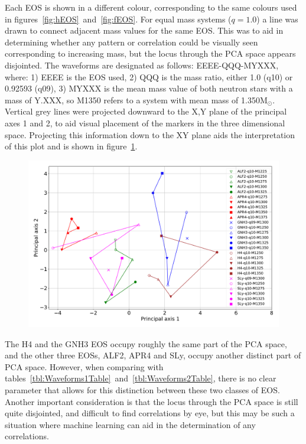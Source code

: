 Each EOS is shown in a different colour, corresponding to the same colours used in figures~\ref{fig:hEOS}~and~\ref{fig:fEOS}. For equal mass systems ($q=1.0$) a line was drawn to connect adjacent mass values for the same EOS. This was to aid in determining whether any pattern or correlation could be visually seen corresponding to increasing mass, but the locus through the PCA space appears disjointed. The waveforms are designated as follows: EEEE-QQQ-MYXXX, where: 1) EEEE is the EOS used, 2) QQQ is the mass ratio, either 1.0 (q10) or 0.92593 (q09), 3) MYXXX is the mean mass value of both neutron stars with a mass of Y.XXX, so M1350 refers to a system with mean mass of 1.350M$_\odot$. Vertical grey lines were projected downward to the X,Y plane of the principal axes 1 and 2, to aid visual placement of the markers in the three dimensional space. Projecting this information down to the XY plane aids the interpretation of this plot  and is shown in figure~\ref{fig:PCAScaled2Damp}.
\begin{figure}[H]
	\centering
	\includegraphics[width=15cm]{./img/PCAScaled2Damp.pdf} 
	\caption[\protect]{\protect}
	\label{fig:PCAScaled2Damp}
\end{figure}
The H4 and the GNH3 EOS occupy roughly the same part of the PCA space, and the other three EOSs, ALF2, APR4 and SLy, occupy another distinct part of PCA space. However, when comparing  with tables~\ref{tbl:Waveforms1Table}~and~\ref{tbl:Waveforms2Table}, there is no clear parameter that allows for this distinction between these two classes of EOS. Another important consideration is that the locus through the PCA space is still quite disjointed, and difficult to find correlations by eye, but this may be such a situation where machine learning can aid in the determination of any correlations. \par 
